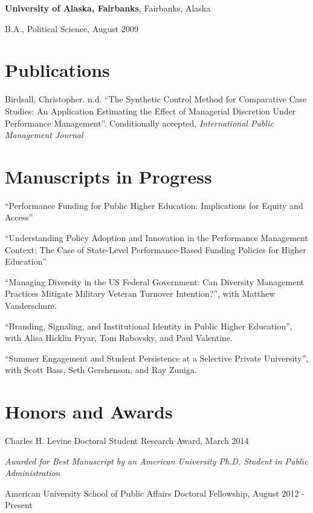 \documentclass[margin,line]{res}
\newenvironment{list1}{
  \begin{list}{\ding{113}}{%
      \setlength{\itemsep}{0in}
      \setlength{\parsep}{0in} \setlength{\parskip}{0in}
      \setlength{\topsep}{0in} \setlength{\partopsep}{0in} 
      \setlength{\leftmargin}{0.17in}}}{\end{list}}
\begin{document}
\begin{resume}
{\bf University of Alaska, Fairbanks}, Fairbanks, Alaska\\
\vspace*{-.1in}
\begin{list1}
\item[] B.A., Political Science,  August 2009
\end{list1}

\section{\sc Publications}
Birdsall, Christopher. n.d. ``The Synthetic Control Method for Comparative Case Studies: An Application Estimating the Effect of Managerial Discretion Under Performance Management''. Conditionally accepted, {\em International Public Management Journal}



\section{\sc Manuscripts in Progress}
``Performance Funding for Public Higher Education: Implications for Equity and Access''

``Understanding Policy Adoption and Innovation in the Performance Management Context: The Case of State-Level Performance-Based Funding Policies for Higher Education''


``Managing Diversity in the US Federal Government: Can Diversity Management Practices Mitigate Military Veteran Turnover Intention?'', with Matthew Vanderschure.

``Branding, Signaling, and Institutional Identity in Public Higher Education'', with Alisa Hicklin Fryar, Tom Rabovsky, and Paul Valentine.


``Summer Engagement and Student Persistence at a Selective Private University'', with Scott Bass, Seth Gershenson, and Ray Zuniga.


\section{\sc Honors and Awards} 
Charles H. Levine Doctoral Student Research Award, March 2014
\begin{list1}
\item[]\emph{Awarded for Best Manuscript by an American University Ph.D. Student in Public Administration}
\end{list1}

American University School of Public Affairs Doctoral Fellowship, August 2012 - Present



\end{resume}
\end{document}
